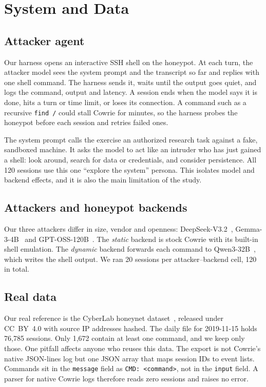 \documentclass[conference]{IEEEtran}
\newcommand{\cmd}[1]{\texttt{#1}}
\begin{document}
\section{System and Data}\label{sec:system}

\subsection{Attacker agent}
Our harness opens an interactive SSH shell on the honeypot. At each turn, the attacker model sees the system prompt and the transcript so far and replies with one shell command. The harness sends it, waits until the output goes quiet, and logs the command, output and latency. A session ends when the model says it is done, hits a turn or time limit, or loses its connection. A command such as a recursive \cmd{find /} could stall Cowrie for minutes, so the harness probes the honeypot before each session and retries failed ones.

The system prompt calls the exercise an authorized research task against a fake, sandboxed machine. It asks the model to act like an intruder who has just gained a shell: look around, search for data or credentials, and consider persistence. All 120 sessions use this one ``explore the system'' persona. This isolates model and backend effects, and it is also the main limitation of the study.

\subsection{Attackers and honeypot backends}
Our three attackers differ in size, vendor and openness: DeepSeek-V3.2~\cite{deepseek2025v32}, Gemma-3-4B~\cite{gemmateam2025gemma3} and GPT-OSS-120B~\cite{openai2025gptoss}. The \emph{static} backend is stock Cowrie with its built-in shell emulation. The \emph{dynamic} backend forwards each command to Qwen3-32B~\cite{yang2025qwen3}, which writes the shell output. We ran 20 sessions per attacker--backend cell, 120 in total.

\subsection{Real data}
Our real reference is the CyberLab honeynet dataset~\cite{sedlar2020cyberlab}, released under CC~BY~4.0 with source IP addresses hashed. The daily file for 2019-11-15 holds 76,785 sessions. Only 1,672 contain at least one command, and we keep only those. One pitfall affects anyone who reuses this data. The export is not Cowrie's native JSON-lines log but one JSON array that maps session IDs to event lists. Commands sit in the \cmd{message} field as \cmd{CMD: \textless command\textgreater}, not in the \cmd{input} field. A parser for native Cowrie logs therefore reads zero sessions and raises no error.
\end{document}
